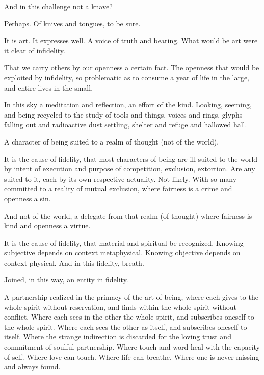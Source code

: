 And in this challenge not a knave?

Perhaps.  Of knives and tongues, to be sure.

It is art.  It expresses well.  A voice of truth and bearing.  What
would be art were it clear of infidelity.

That we carry others by our openness a certain fact.  The openness
that would be exploited by infidelity, so problematic as to consume a
year of life in the large, and entire lives in the small.

\vfill
\break

﻿In this sky a meditation and reflection, an effort of the kind.
Looking, seeming, and being recycled to the study of tools and things,
voices and rings, glyphs falling out and radioactive dust settling,
shelter and refuge and hallowed hall.

A character of being suited to a realm of thought (not of the world).

It is the cause of fidelity, that most characters of being are ill
suited to the world by intent of execution and purpose of competition,
exclusion, extortion.  Are any suited to it, each by its own
respective actuality.  Not likely.  With so many committed to a
reality of mutual exclusion, where fairness is a crime and openness a
sin.

And not of the world, a delegate from that realm (of thought) where
fairness is kind and openness a virtue.

It is the cause of fidelity, that material and spiritual be
recognized.  Knowing subjective depends on context metaphysical.
Knowing objective depends on context physical.  And in this fidelity,
breath.

Joined, in this way, an entity in fidelity.  

A partnership realized in the primacy of the art of being, where each
gives to the whole spirit without reservation, and finds within the
whole spirit without conflict.  Where each sees in the other the whole
spirit, and subscribes oneself to the whole spirit.  Where each sees
the other as itself, and subscribes oneself to itself.  Where the
strange indirection is discarded for the loving trust and commitment
of soulful partnership.  Where touch and word heal with the capacity
of self.  Where love can touch.  Where life can breathe.  Where one is
never missing and always found.

\vfill
\bye
